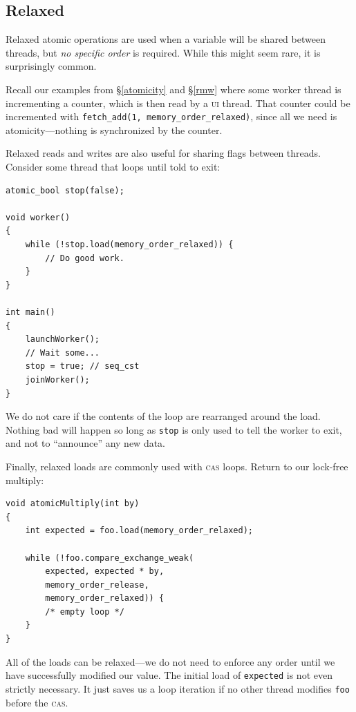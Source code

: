 \documentclass[fontsize=10pt, oneside]{scrartcl}
\newcommand{\codesize}{\fontsize{\bodyfontsize}{\bodybaselineskip}}
\newcommand{\secref}[1]{\hyperref[#1]{\textsc{\S}\ref*{#1}}}
\newenvironment{colfigure}
  {\par\vspace{1\baselineskip minus 0.5\baselineskip}\noindent\minipage{\linewidth}}
  {\endminipage\vspace{1\baselineskip minus 0.7\baselineskip}}
\begin{document}
\subsection{Relaxed}

Relaxed atomic operations are used when a variable will be shared between threads,
but \emph{no specific order} is required.
While this might seem rare, it is surprisingly common.

Recall our examples from \secref{atomicity} and \secref{rmw} where some worker
thread is incrementing a counter, which is then read by a \textsc{ui} thread.
That counter could be incremented with \texttt{fetch\_add(1, memory\_order\_relaxed)},
since all we need is atomicity---nothing is synchronized by the counter.

Relaxed reads and writes are also useful for sharing flags between threads.
Consider some thread that loops until told to exit:
\begin{colfigure}
\begin{verbatim}
atomic_bool stop(false);

void worker()
{
    while (!stop.load(memory_order_relaxed)) {
        // Do good work.
    }
}

int main()
{
    launchWorker();
    // Wait some...
    stop = true; // seq_cst
    joinWorker();
}
\end{verbatim}
\end{colfigure}
We do not care if the contents of the loop are rearranged around the load.
Nothing bad will happen so long as \texttt{stop} is only used to tell the worker to exit, and not to ``announce'' any new data.

Finally, relaxed loads are commonly used with \textsc{cas} loops.
Return to our lock-free multiply:
\begin{colfigure}
\begin{verbatim}
void atomicMultiply(int by)
{
    int expected = foo.load(memory_order_relaxed);

    while (!foo.compare_exchange_weak(
        expected, expected * by,
        memory_order_release,
        memory_order_relaxed)) {
        /* empty loop */
    }
}
\end{verbatim}
\end{colfigure}
All of the loads can be relaxed---we do not need to enforce any order until we have successfully modified our value.
The initial load of \texttt{expected} is not even strictly necessary.
It just saves us a loop iteration if no other thread modifies
\texttt{foo} before the \textsc{cas}.
\end{document}
